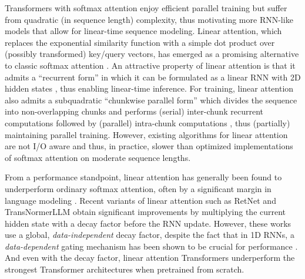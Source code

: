 \label{sec:intro}
Transformers with softmax attention \citep{vaswani2017attention}  enjoy efficient parallel training but suffer from quadratic (in sequence length) complexity, thus motivating more RNN-like models that allow for linear-time sequence modeling. Linear attention, which replaces the exponential similarity function with a simple dot product over (possibly transformed) key/query vectors, has emerged as a promising alternative to classic softmax attention \citep{katharopoulos2020transformers,performer,kasai-etal-2021-finetuning,peng2021random}. An attractive property of linear attention  is that it admits a  ``recurrent form'' in which it can be formulated as a linear RNN with 2D hidden states \citep{katharopoulos2020transformers}, thus enabling linear-time  inference. For training, linear attention  also admits a subquadratic ``chunkwise parallel form'' which divides the sequence into non-overlapping chunks and performs (serial) inter-chunk recurrent computations followed by (parallel) intra-chunk computations \citep{GAU,sun2023retentive,VQ-Transformer}, thus (partially) maintaining  parallel training. However,  existing algorithms for linear attention are not I/O aware and thus, in practice, slower than  optimized implementations of softmax attention \cite{flashattention1,flashattention2} on moderate sequence lengths.

From a performance standpoint,  linear attention has generally been found to underperform ordinary softmax attention, often by a significant margin in language modeling \cite{kasai-etal-2021-finetuning}. Recent variants of linear attention such as RetNet \citep{sun2023retentive} and TransNormerLLM \citep{qin2023scaling} obtain significant improvements by multiplying the current hidden state with a decay factor before the RNN update. However,  these works use a global, \emph{data-independent} decay factor, despite the fact that in 1D RNNs, a \emph{data-dependent} gating mechanism has been shown to be crucial for performance \citep{unreasonable-forget-gate,HGRN}. And even with the decay factor, linear attention Transformers underperform the strongest Transformer architectures when pretrained from scratch. 

